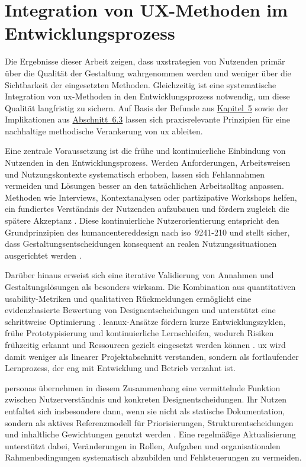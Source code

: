 \section{Integration von UX-Methoden im Entwicklungsprozess}
\label{sec:07-02_integration-of-ux-methods}

Die Ergebnisse dieser Arbeit zeigen, dass \Gls{uxstrategien} von Nutzenden primär über die Qualität der Gestaltung wahrgenommen werden und weniger über die Sichtbarkeit der eingesetzten Methoden. Gleichzeitig ist eine systematische Integration von \Gls{ux}-Methoden in den Entwicklungsprozess notwendig, um diese Qualität langfristig zu sichern. Auf Basis der Befunde aus \hyperref[ch:05_analysis-and-results]{Kapitel~5} sowie der Implikationen aus \hyperref[sec:06-03_organizational-ux-implications]{Abschnitt~6.3} lassen sich praxisrelevante Prinzipien für eine nachhaltige methodische Verankerung von \Gls{ux} ableiten.

Eine zentrale Voraussetzung ist die frühe und kontinuierliche Einbindung von Nutzenden in den Entwicklungsprozess. Werden Anforderungen, Arbeitsweisen und Nutzungskontexte systematisch erhoben, lassen sich Fehlannahmen vermeiden und Lösungen besser an den tatsächlichen Arbeitsalltag anpassen. Methoden wie Interviews, Kontextanalysen oder partizipative Workshops helfen, ein fundiertes Verständnis der Nutzenden aufzubauen und fördern zugleich die spätere Akzeptanz \cite{118:NNGUserInvolvement,405:KvaleBrinkmann2015}. Diese kontinuierliche Nutzerorientierung entspricht den Grundprinzipien des \Gls{humancentereddesign} nach \acrshort{iso}~9241-210 und stellt sicher, dass Gestaltungsentscheidungen konsequent an realen Nutzungssituationen ausgerichtet werden \cite{500:ISO9241-210}.

Darüber hinaus erweist sich eine iterative Validierung von Annahmen und Gestaltungslösungen als besonders wirksam. Die Kombination aus quantitativen \Gls{usability}-Metriken und qualitativen Rückmeldungen ermöglicht eine evidenzbasierte Bewertung von Designentscheidungen und unterstützt eine schrittweise Optimierung \cite{121:NNGUsabilityTesting,124:Triangulation2023}. \Gls{leanux}-Ansätze fördern kurze Entwicklungszyklen, frühe Prototypisierung und kontinuierliche Lernschleifen, wodurch Risiken frühzeitig erkannt und Ressourcen gezielt eingesetzt werden können \cite{424:GothelfSeiden2016}. \Gls{ux} wird damit weniger als linearer Projektabschnitt verstanden, sondern als fortlaufender Lernprozess, der eng mit Entwicklung und Betrieb verzahnt ist.

\Gls{personas} übernehmen in diesem Zusammenhang eine vermittelnde Funktion zwischen Nutzerverständnis und konkreten Designentscheidungen. Ihr Nutzen entfaltet sich insbesondere dann, wenn sie nicht als statische Dokumentation, sondern als aktives Referenzmodell für Priorisierungen, Strukturentscheidungen und inhaltliche Gewichtungen genutzt werden \cite{112:StepTwoPersonas,308:DWGSegmentation}. Eine regelmäßige Aktualisierung unterstützt dabei, Veränderungen in Rollen, Aufgaben und organisationalen Rahmenbedingungen systematisch abzubilden und Fehlsteuerungen zu vermeiden.

